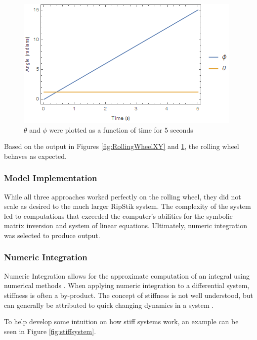 \begin{figure}[!htb]
	\centering
	\includegraphics[width=\linewidth]{RollingWheelThetaPhi.png}
	\endminipage\hspace{1em}%
	\caption{$\theta$ and $\phi$ were plotted as a function of time for 5 seconds}\label{fig:RollingWheelThetaPhi}
\end{figure}

Based on the output in Figures \ref{fig:RollingWheelXY} and \ref{fig:RollingWheelThetaPhi}, the rolling wheel behaves as expected. 


\subsubsection{Model Implementation}

While all three approaches worked perfectly on the rolling wheel, they did not scale as desired to the much larger RipStik system.
The complexity of the system led to computations that exceeded the computer's abilities for the symbolic matrix inversion and system of linear equations.
Ultimately, numeric integration was selected to produce output.

\subsubsection{Numeric Integration}

Numeric Integration allows for the approximate computation of an integral using numerical methods \cite{WolframNumeric}.
When applying numeric integration to a differential system, stiffness is often a by-product.
The concept of stiffness is not well understood, but can generally be attributed to quick changing dynamics in a system \cite{StiffSystem}.
\par
To help develop some intuition on how stiff systems work, an example can be seen in Figure \ref{fig:stiffsystem}.

